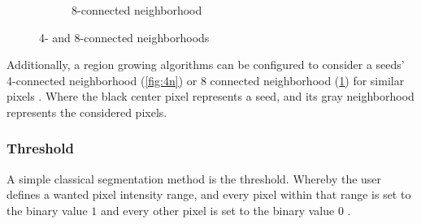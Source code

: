 \begin{figure}[h!]
\begin{subfigure}{0.49\textwidth}
{}
		\caption{8-connected neighborhood}\label{fig:8n}
	\end{subfigure}
	\caption{4- and 8-connected neighborhoods}\label{fig:neighborhoods}
\end{figure}

\noindent
Additionally, a region growing algorithms can be configured to consider a seeds' 4-connected neighborhood
(\cref{fig:4n}) or 8 connected neighborhood (\cref{fig:8n}) for similar pixels \cite{jourlinVariousContrastConcepts2016,palReviewImageSegmentation1993}.
Where the black center pixel represents a seed, and its gray neighborhood represents the considered pixels.


\subsubsection{Threshold}
A simple classical segmentation method is the threshold.
Whereby the user defines a wanted pixel intensity range, and every pixel within that range is set to the binary value $1$
and every other pixel is set to the binary value $0$ \cite{sankurSurveyImageThresholding2004}.

